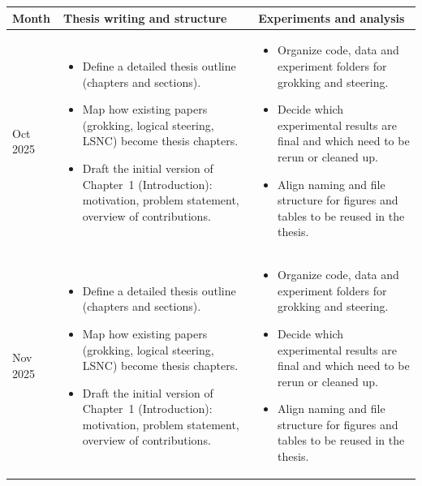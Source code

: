 \documentclass[../../infufrgs/ppgc-prop-tese.tex]{subfiles}
\begin{document}

\small\begin{longtable}{p{}p{}p{}}
\centering
\textbf{Month} & \textbf{Thesis writing and structure} & \textbf{Experiments and analysis} \\
\hline
Oct 2025 &
\begin{itemize}
  \item Define a detailed thesis outline (chapters and sections).
  \item Map how existing papers (grokking, logical steering, LSNC) become thesis chapters.
  \item Draft the initial version of Chapter~1 (Introduction): motivation, problem statement, overview of contributions.
\end{itemize}
&
\begin{itemize}
  \item Organize code, data and experiment folders for grokking and steering.
  \item Decide which experimental results are final and which need to be rerun or cleaned up.
  \item Align naming and file structure for figures and tables to be reused in the thesis.
\end{itemize}
\\

Nov 2025 &
\begin{itemize}
  \item Define a detailed thesis outline (chapters and sections).
  \item Map how existing papers (grokking, logical steering, LSNC) become thesis chapters.
  \item Draft the initial version of Chapter~1 (Introduction): motivation, problem statement, overview of contributions.
\end{itemize}
&
\begin{itemize}
  \item Organize code, data and experiment folders for grokking and steering.
  \item Decide which experimental results are final and which need to be rerun or cleaned up.
  \item Align naming and file structure for figures and tables to be reused in the thesis.
\end{itemize}
\\


\end{longtable}
\end{document}
